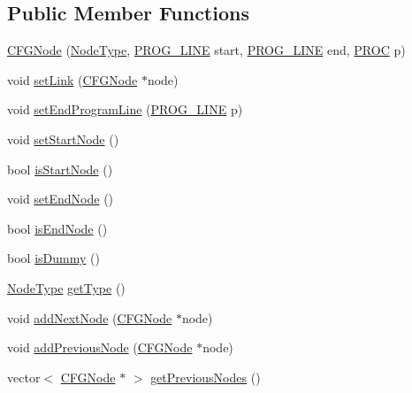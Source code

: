 \subsection*{Public Member Functions}
\begin{DoxyCompactItemize}
\item 
\hyperlink{class_c_f_g_node_addba1ddd8abe5f584389e05926251eaa}{C\-F\-G\-Node} (\hyperlink{class_c_f_g_node_aa0933713506a9c0226e705703ee5b079}{Node\-Type}, \hyperlink{std_afx_8h_abcc2d0120d16c2587a85b314010f6399}{P\-R\-O\-G\-\_\-\-L\-I\-N\-E} start, \hyperlink{std_afx_8h_abcc2d0120d16c2587a85b314010f6399}{P\-R\-O\-G\-\_\-\-L\-I\-N\-E} end, \hyperlink{std_afx_8h_aa07ea1d188c7b45668f1bd82ffd6d87e}{P\-R\-O\-C} p)
\item 
void \hyperlink{class_c_f_g_node_aa1031de36b07269df1fe0adcf5557b90}{set\-Link} (\hyperlink{class_c_f_g_node}{C\-F\-G\-Node} $\ast$node)
\item 
void \hyperlink{class_c_f_g_node_a247dcbf53b30ba6a38d945d0f0f81a3c}{set\-End\-Program\-Line} (\hyperlink{std_afx_8h_abcc2d0120d16c2587a85b314010f6399}{P\-R\-O\-G\-\_\-\-L\-I\-N\-E} p)
\item 
void \hyperlink{class_c_f_g_node_a846539f346c2569c94c9a5057eee6bd9}{set\-Start\-Node} ()
\item 
bool \hyperlink{class_c_f_g_node_af92552f9f6b3e6d2de45315d96c73d5d}{is\-Start\-Node} ()
\item 
void \hyperlink{class_c_f_g_node_aea9ee4d496ada4a81b69d658448923df}{set\-End\-Node} ()
\item 
bool \hyperlink{class_c_f_g_node_a3ab53c9e1cf0896ccfbf5a3c19d2cadf}{is\-End\-Node} ()
\item 
bool \hyperlink{class_c_f_g_node_a20b7acc68b6f1cc793865a761ad05fff}{is\-Dummy} ()
\item 
\hyperlink{class_c_f_g_node_aa0933713506a9c0226e705703ee5b079}{Node\-Type} \hyperlink{class_c_f_g_node_adb8c96a8b6c41ab78223b379ae8edd06}{get\-Type} ()
\item 
void \hyperlink{class_c_f_g_node_ae3c039c5f6e2c55e50faa63b0941b11e}{add\-Next\-Node} (\hyperlink{class_c_f_g_node}{C\-F\-G\-Node} $\ast$node)
\item 
void \hyperlink{class_c_f_g_node_ab2c09ac0d4d4700d7cc2bab9a2044c24}{add\-Previous\-Node} (\hyperlink{class_c_f_g_node}{C\-F\-G\-Node} $\ast$node)
\item 
vector$<$ \hyperlink{class_c_f_g_node}{C\-F\-G\-Node} $\ast$ $>$ \hyperlink{class_c_f_g_node_aa462795f2f35b263c5e6c3f39ab88e21}{get\-Previous\-Nodes} ()
\item 

\end{DoxyCompactItemize}
